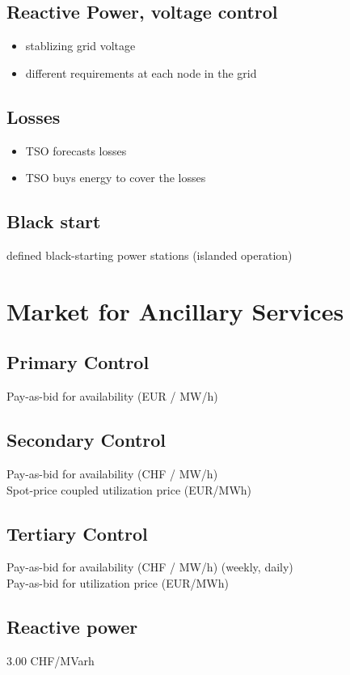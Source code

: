 \documentclass[fs, footer]{latex4ei}
\begin{document}
\begin{multicols*}{4}
\subsection{Reactive Power, voltage control}
\begin{itemize}
	\item stablizing grid voltage
	\item different requirements at each node in the grid
\end{itemize}
\subsection{Losses}
\begin{itemize}
	\item TSO forecasts losses
	\item TSO buys energy to cover the losses
\end{itemize}
\subsection{Black start}  
defined black-starting power stations (islanded operation)
\section{Market for Ancillary Services}

\subsection{Primary Control} Pay-as-bid for availability (EUR / MW/h)

\subsection{Secondary Control}

Pay-as-bid for availability (CHF / MW/h) \\
Spot-price coupled utilization price (EUR/MWh)

\subsection{Tertiary Control}

Pay-as-bid for availability (CHF / MW/h) (weekly, daily)\\
Pay-as-bid for utilization price (EUR/MWh)

\subsection{Reactive power} 3.00 CHF/MVarh


\end{multicols*}
\end{document}
